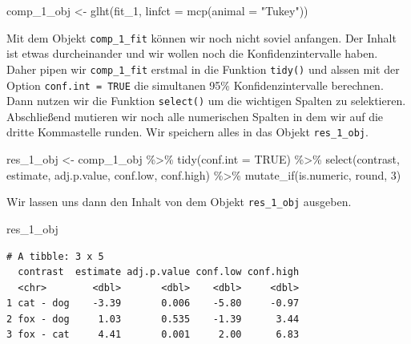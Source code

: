 \documentclass[
  letterpaper,
  DIV=11,
  oneside]{scrreport}
\newenvironment{Shaded}{\begin{snugshade}}{\end{snugshade}}
\newcommand{\AttributeTok}[1]{\textcolor[rgb]{0.40,0.45,0.13}{#1}}
\newcommand{\ConstantTok}[1]{\textcolor[rgb]{0.56,0.35,0.01}{#1}}
\newcommand{\DecValTok}[1]{\textcolor[rgb]{0.68,0.00,0.00}{#1}}
\newcommand{\FunctionTok}[1]{\textcolor[rgb]{0.28,0.35,0.67}{#1}}
\newcommand{\NormalTok}[1]{\textcolor[rgb]{0.00,0.23,0.31}{#1}}
\newcommand{\OtherTok}[1]{\textcolor[rgb]{0.00,0.23,0.31}{#1}}
\newcommand{\SpecialCharTok}[1]{\textcolor[rgb]{0.37,0.37,0.37}{#1}}
\newcommand{\StringTok}[1]{\textcolor[rgb]{0.13,0.47,0.30}{#1}}
\begin{document}
\begin{Shaded}
\begin{Highlighting}[]
\NormalTok{comp\_1\_obj }\OtherTok{\textless{}{-}} \FunctionTok{glht}\NormalTok{(fit\_1, }\AttributeTok{linfct =} \FunctionTok{mcp}\NormalTok{(}\AttributeTok{animal =} \StringTok{"Tukey"}\NormalTok{)) }
\end{Highlighting}
\end{Shaded}

Mit dem Objekt \texttt{comp\_1\_fit} können wir noch nicht soviel
anfangen. Der Inhalt ist etwas durcheinander und wir wollen noch die
Konfidenzintervalle haben. Daher pipen wir \texttt{comp\_1\_fit} erstmal
in die Funktion \texttt{tidy()} und alssen mit der Option
\texttt{conf.int\ =\ TRUE} die simultanen 95\% Konfidenzintervalle
berechnen. Dann nutzen wir die Funktion \texttt{select()} um die
wichtigen Spalten zu selektieren. Abschließend mutieren wir noch alle
numerischen Spalten in dem wir auf die dritte Kommastelle runden. Wir
speichern alles in das Objekt \texttt{res\_1\_obj}.

\begin{Shaded}
\begin{Highlighting}[]
\NormalTok{res\_1\_obj }\OtherTok{\textless{}{-}}\NormalTok{ comp\_1\_obj }\SpecialCharTok{\%\textgreater{}\%} 
  \FunctionTok{tidy}\NormalTok{(}\AttributeTok{conf.int =} \ConstantTok{TRUE}\NormalTok{) }\SpecialCharTok{\%\textgreater{}\%} 
  \FunctionTok{select}\NormalTok{(contrast, estimate, adj.p.value, }
\NormalTok{         conf.low, conf.high) }\SpecialCharTok{\%\textgreater{}\%} 
  \FunctionTok{mutate\_if}\NormalTok{(is.numeric, round, }\DecValTok{3}\NormalTok{)}
\end{Highlighting}
\end{Shaded}

Wir lassen uns dann den Inhalt von dem Objekt \texttt{res\_1\_obj}
ausgeben.

\begin{Shaded}
\begin{Highlighting}[]
\NormalTok{res\_1\_obj}
\end{Highlighting}
\end{Shaded}

\begin{verbatim}
# A tibble: 3 x 5
  contrast  estimate adj.p.value conf.low conf.high
  <chr>        <dbl>       <dbl>    <dbl>     <dbl>
1 cat - dog    -3.39       0.006    -5.80     -0.97
2 fox - dog     1.03       0.535    -1.39      3.44
3 fox - cat     4.41       0.001     2.00      6.83
\end{verbatim}
\end{document}
